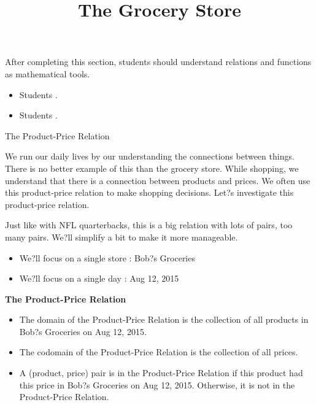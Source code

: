 \documentclass{ximera}
\title{The Grocery Store}
\begin{document}
\begin{abstract}
\end{abstract}

\maketitle

\begin{sectionOutcomes}

After completing this section, students should understand relations and functions as mathematical tools. 

\begin{itemize}
\item Students .
\item Students .
\end{itemize}

\end{sectionOutcomes}


\Large{The Product-Price Relation}



We run our daily lives by our understanding the connections between things.  There is no better example of this than the grocery store.  While shopping, we understand that there is a connection between products and prices. We often use this product-price relation to make shopping decisions.  Let?s investigate this product-price relation.

Just like with NFL quarterbacks, this is a big relation with lots of pairs, too many pairs.  We?ll simplify a bit to make it more manageable. 

\begin{itemize}
\item We?ll focus on a single store : Bob?s Groceries
\item We?ll focus on a single day : Aug 12, 2015
\end{itemize}


\begin{definition}
\textbf{The Product-Price Relation}
\begin{itemize}
\item The domain of the Product-Price Relation is the collection of all products in Bob?s Groceries on Aug 12, 2015. 
\item The codomain of the Product-Price Relation is the collection of all prices. 
\item A (product, price) pair is in the Product-Price Relation if this product had this price in Bob?s Groceries on Aug 12, 2015. Otherwise, it is not in the Product-Price Relation.
\end{itemize}
\end{definition}
\end{document}
